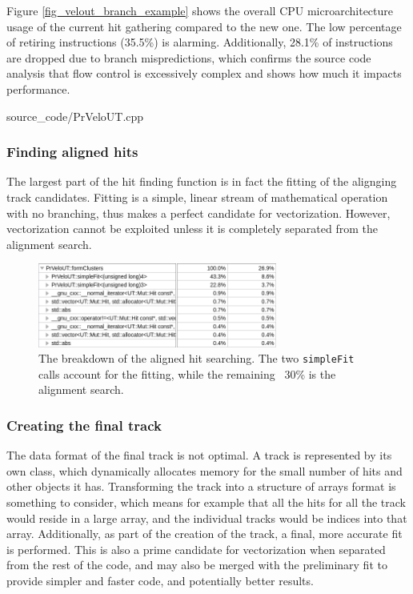 \documentclass[12pt]{article}
\newcommand{\code}[1]{\texttt{#1}}
\begin{document}
Figure \ref{fig_velout_branch_example} shows the overall CPU microarchitecture usage of the current hit gathering compared to the new one. The low percentage of retiring instructions (35.5\%) is alarming. Additionally, 28.1\% of instructions are dropped due to branch mispredictions, which confirms the source code analysis that flow control is excessively complex and shows how much it impacts performance.
\newpage

	{source_code/PrVeloUT.cpp}
\newpage

\subsubsection{Finding aligned hits}

The largest part of the hit finding function is in fact the fitting of the alignging track candidates. Fitting is a simple, linear stream of mathematical operation with no branching, thus makes a perfect candidate for vectorization. However, vectorization cannot be exploited unless it is completely separated from the alignment search.

\begin{figure}[H]
	\begin{center}
		\includegraphics[width=0.7\textwidth]{velout_hotspots_orig_formclusters}
	\end{center}
	\caption{The breakdown of the aligned hit searching. The two \code{simpleFit} calls account for the fitting, while the remaining ~30\% is the alignment search.}
	\label{fig_velout_hotspots_orig_formclusters}
\end{figure}


\subsubsection{Creating the final track}

The data format of the final track is not optimal. A track is represented by its own class, which dynamically allocates memory for the small number of hits and other objects it has. Transforming the track into a structure of arrays format is something to consider, which means for example that all the hits for all the track would reside in a large array, and the individual tracks would be indices into that array.
Additionally, as part of the creation of the track, a final, more accurate fit is performed. This is also a prime candidate for vectorization when separated from the rest of the code, and may also be merged with the preliminary fit to provide simpler and faster code, and potentially better results.
\end{document}
